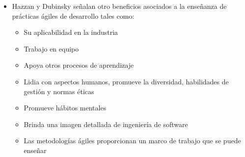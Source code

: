 \documentclass[journal]{IEEEtran}
\begin{document}
\begin{itemize}
    \item Hazzan y Dubinsky \cite{hazzan-dubinsky} señalan otro beneficios asociados a la enseñanza de prácticas ágiles de desarrollo tales como:
    \begin{itemize}
        \item Su aplicabilidad en la industria
        \item Trabajo en equipo
        \item Apoya otros procesos de aprendizaje
        \item Lidia con aspectos humanos, promueve la diversidad, habilidades de gestión y normas éticas
        \item Promueve hábitos mentales
        \item Brinda una imagen detallada de ingeniería de software
        \item Las metodologías ágiles proporcionan un marco de trabajo que se puede enseñar
    \end{itemize}
\end{itemize}
\end{document}
